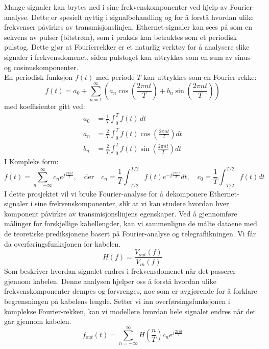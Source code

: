 Mange signaler kan brytes ned i sine frekvenskomponenter ved hjelp av Fourier-analyse. Dette er spesielt nyttig i signalbehandling og for å forstå hvordan ulike frekvenser påvirkes av transmisjonslinjen. Ethernet-signaler kan sees på som en sekvens av pulser (bitstrøm), som i praksis kan betraktes som et periodisk pulstog. Dette gjør at Fourierrekker er et naturlig verktøy for å analysere slike signaler i frekvensdomenet, siden pulstoget kan uttrykkes som en sum av sinus- og cosinuskomponenter.\\[1em]
En periodisk funksjon $f(t)$ med periode $T$ kan uttrykkes som en Fourier-rekke:
\begin{equation}
f(t) = a_0 + \sum_{n=1}^{\infty} \left( a_n \cos\left(\frac{2\pi n t}{T}\right) + b_n \sin\left(\frac{2\pi n t}{T}\right) \right)
\end{equation}
med koeffisienter gitt ved:
\begin{align*}
a_0 &= \frac{1}{T} \int_{0}^{T} f(t) \, dt \\
a_n &= \frac{2}{T} \int_{0}^{T} f(t) \cos\left(\frac{2\pi n t}{T}\right) dt \\
b_n &= \frac{2}{T} \int_{0}^{T} f(t) \sin\left(\frac{2\pi n t}{T}\right) dt
\end{align*}
I Kompleks form:
\begin{equation}
f(t) = \sum_{n=-\infty}^{\infty} c_n e^{j \frac{2\pi n t}{T}}, \quad \text{der} \quad c_n = \frac{1}{T} \int_{-T/2}^{T/2} f(t) e^{-j \frac{2\pi n t}{T}} dt, \quad c_0 = \frac{1}{T} \int_{-T/2}^{T/2} f(t) dt
\end{equation}
I dette prosjektet vil vi bruke Fourier-analyse for å dekomponere Ethernet-signaler i sine frekvenskomponenter, slik at vi kan studere hvordan hver komponent påvirkes av transmisjonslinjens egenskaper.
Ved å gjennomføre målinger for forskjellige kabellengder, kan vi sammenligne de målte dataene med de teoretiske prediksjonene basert på Fourier-analyse og telegraflikningen.
Vi får da overføringsfunksjonen for kabelen.
\begin{equation}
    H(f) = \frac{V_{out}(f)}{V_{in}(f)}
\end{equation}
Som beskriver hvordan signalet endres i frekvensdomenet når det passerer gjennom kabelen.
Denne analysen hjelper oss å forstå hvordan ulike frekvenskomponenter dempes og forvrenges, noe som er avgjørende for å forklare begrensningen på kabelens lengde.
Setter vi inn overførsingsfunksjonen i komplekse Fourier-rekken, kan vi modellere hvordan hele signalet endres når det går gjennom kabelen.
\begin{equation}
    f_{out}(t) = \sum_{n=-\infty}^{\infty} H\left(\frac{n}{T}\right) c_n e^{j \frac{2\pi n t}{T}}
\end{equation}
